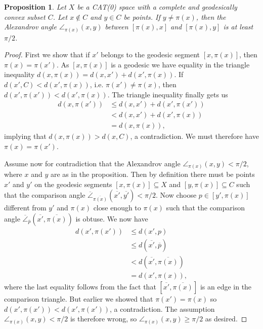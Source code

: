 \documentclass[11pt, a4paper, oneside]{memoir}
\theoremstyle{plain}\newtheorem{theorem}[subsection]{Theorem}
\newtheorem{proposition}[subsection]{Proposition}
\theoremstyle{definition}
\begin{document}
\begin{proposition}\label{prop:projection_angle}
    Let \(X\) be a CAT(0) space with a complete and geodesically convex subset \(C\).
    Let \(x\notin C\) and \(y\in C\) be points.
    If \(y\neq\pi(x)\), then the Alexandrov angle \(\angle_{\pi(x)}(x,y)\) between \([\pi(x),x]\) and \([\pi(x),y]\) is at least \(\pi/2\).
\end{proposition}
\begin{proof}
First we show that if \(x'\) belongs to the geodesic segment \([x,\pi(x)]\), then \(\pi(x)=\pi(x')\).
As \([x,\pi(x)]\) is a geodesic we have equality in the triangle inequality \(d(x,\pi(x))=d(x,x')+d(x',\pi(x))\).
If \(d(x',C)<d(x',\pi(x))\), i.e. \(\pi(x')\neq \pi(x)\), then \(d(x',\pi(x'))<d(x',\pi(x))\).
The triangle inequality finally gets us
\begin{align*}
d(x,\pi(x'))&\leq d(x,x')+d(x',\pi(x'))\\
            &< d(x,x')+d(x',\pi(x))\\
            &= d(x,\pi(x)),
\end{align*}
implying that \(d(x,\pi(x))>d(x,C)\), a contradiction.
We must therefore have \(\pi(x)=\pi(x')\).

Assume now for contradiction that the Alexandrov angle \(\angle_{\pi(x)}(x,y)<\pi/2\), where \(x\) and \(y\) are as in the proposition.
Then by definition there must be points \(x'\) and \(y'\) on the geodesic segments \([x,\pi(x)]\subseteq X\) and \([y,\pi(x)]\subseteq C\) such that the comparison angle \(\overline{\angle}_{\overline{\pi(x)}}(\overline{x'},\overline{y'})<\pi/2\).
Now choose \(p\in[y',\pi(x)]\) different from \(y'\) and \(\pi(x)\) close enough to \(\pi(x)\) such that the comparison angle \(\overline{\angle}_{\overline{p}}(\overline{x'},\overline{\pi(x)})\) is obtuse.
We now have
\begin{align*}
d(x',\pi(x'))&\leq d(x',p)\tag{as projection}\\
                &\leq d(\overline{x'},\overline{p})\tag{CAT(0)}\\
                &<d(\overline{x'},\overline{\pi(x)})\tag{as obtuse}\\
                &=d(x',\pi(x)),
\end{align*}
where the last equality follows from the fact that \([\overline{x'},\overline{\pi(x)}]\) is an edge in the comparison triangle.
But earlier we showed that \(\pi(x')=\pi(x)\) so \(d(x',\pi(x'))<d(x',\pi(x'))\), a contradiction.
The assumption \(\angle_{\pi(x)}(x,y)<\pi/2\) is therefore wrong, so \(\angle_{\pi(x)}(x,y)\geq \pi/2\) as desired.
\end{proof}
\end{document}
